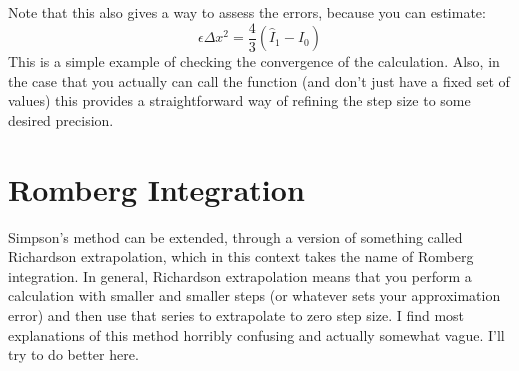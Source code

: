 Note that this also gives a way to assess the errors, because you can
estimate:
\begin{equation}
\epsilon \Delta x^2 = \frac{4}{3}  \left(\hat I_1 - \hat I_0\right)
\end{equation}
This is a simple example of checking the convergence of the
calculation. Also, in the case that you actually can call the function
(and don't just have a fixed set of values) this provides a
straightforward way of refining the step size to some desired
precision.

\section{Romberg Integration}

Simpson's method can be extended, through a version of something
called Richardson extrapolation, which in this context takes the name
of Romberg integration. In general, Richardson extrapolation means
that you perform a calculation with smaller and smaller steps (or
whatever sets your approximation error) and then use that series to
extrapolate to zero step size.  I find most explanations of this
method horribly confusing and actually somewhat vague. I'll try to do
better here.

